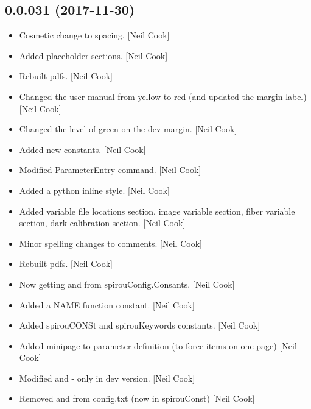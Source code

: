 \documentclass[a4paper,10pt,english]{report}
\begin{document}
\subsection{0.0.031 (2017-11-30)}
\label{\detokenize{misc/changelog:id520}}\begin{itemize}
\item {} 
Cosmetic change to spacing. {[}Neil Cook{]}

\item {} 
Added placeholder sections. {[}Neil Cook{]}

\item {} 
Rebuilt pdfs. {[}Neil Cook{]}

\item {} 
Changed the user manual from yellow to red (and updated the margin
label) {[}Neil Cook{]}

\item {} 
Changed the level of green on the dev margin. {[}Neil Cook{]}

\item {} 
Added new constants. {[}Neil Cook{]}

\item {} 
Modified ParameterEntry command. {[}Neil Cook{]}

\item {} 
Added a python inline style. {[}Neil Cook{]}

\item {} 
Added variable file locations section, image variable section, fiber
variable section, dark calibration section. {[}Neil Cook{]}

\item {} 
Minor spelling changes to comments. {[}Neil Cook{]}

\item {} 
Rebuilt pdfs. {[}Neil Cook{]}

\item {} 
Now getting  and  from spirouConfig.Consants. {[}Neil
Cook{]}

\item {} 
Added a NAME function constant. {[}Neil Cook{]}

\item {} 
Added spirouCONSt and spirouKeywords constants. {[}Neil Cook{]}

\item {} 
Added minipage to parameter definition (to force items on one page)
{[}Neil Cook{]}

\item {} 
Modified  and  - only in dev version. {[}Neil Cook{]}

\item {} 
Removed  and  from config.txt (now in spirouConst)
{[}Neil Cook{]}

\end{itemize}
\end{document}

